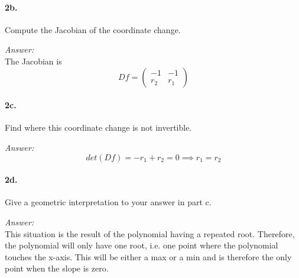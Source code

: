 \documentclass[10pt,a4paper]{article}
\begin{document}
\paragraph{2b.} Compute the Jacobian of the coordinate change.
\begin{flushleft}
\textit{Answer:}\\
The Jacobian is
$$ Df = \begin{pmatrix}
-1 & -1\\
r_2 & r_1
\end{pmatrix}$$
\end{flushleft}

\paragraph{2c.} Find where this coordinate change is not invertible.
\begin{flushleft}
\textit{Answer:}\\
$$ det(Df) = -r_1 + r_2 = 0 \implies r_1 = r_2$$
\end{flushleft}

\paragraph{2d.} Give a geometric interpretation to your answer in part c.
\begin{flushleft}
\textit{Answer:}\\
This situation is the result of the polynomial having a repeated root. Therefore, the polynomial will only have one root, i.e. one point where the polynomial touches the x-axis. This will be either a max or a min and is therefore the only point when the slope is zero.
\end{flushleft}
\end{document}
